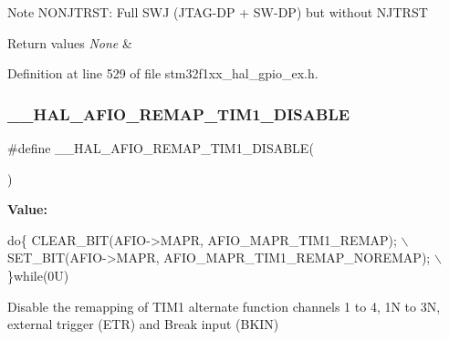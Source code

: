 \begin{DoxyNote}{Note}
N\+O\+N\+J\+T\+R\+ST\+: Full S\+WJ (J\+T\+A\+G-\/\+DP + S\+W-\/\+DP) but without N\+J\+T\+R\+ST 
\end{DoxyNote}

\begin{DoxyRetVals}{Return values}
{\em None} & \\
\hline
\end{DoxyRetVals}


Definition at line 529 of file stm32f1xx\+\_\+hal\+\_\+gpio\+\_\+ex.\+h.

\mbox{\label{group___g_p_i_o_ex___a_f_i_o___a_f___r_e_m_a_p_p_i_n_g_ga0d5d38cb3fbb600d76fdd4625e3d700c}} 
\subsubsection{\texorpdfstring{\+\_\+\+\_\+\+H\+A\+L\+\_\+\+A\+F\+I\+O\+\_\+\+R\+E\+M\+A\+P\+\_\+\+T\+I\+M1\+\_\+\+D\+I\+S\+A\+B\+LE}{\_\_HAL\_AFIO\_REMAP\_TIM1\_DISABLE}}
{\footnotesize\ttfamily \#define \+\_\+\+\_\+\+H\+A\+L\+\_\+\+A\+F\+I\+O\+\_\+\+R\+E\+M\+A\+P\+\_\+\+T\+I\+M1\+\_\+\+D\+I\+S\+A\+B\+LE(\begin{DoxyParamCaption}{ }\end{DoxyParamCaption})}

{\bfseries Value\+:}
\begin{DoxyCode}
\textcolor{keywordflow}{do}\{ CLEAR\_BIT(AFIO->MAPR, AFIO\_MAPR\_TIM1\_REMAP);       \(\backslash\)
                                            SET\_BIT(AFIO->MAPR, AFIO\_MAPR\_TIM1\_REMAP\_NOREMAP); \(\backslash\)
                                          \}\textcolor{keywordflow}{while}(0U)
\end{DoxyCode}


Disable the remapping of T\+I\+M1 alternate function channels 1 to 4, 1N to 3N, external trigger (E\+TR) and Break input (B\+K\+IN) 

